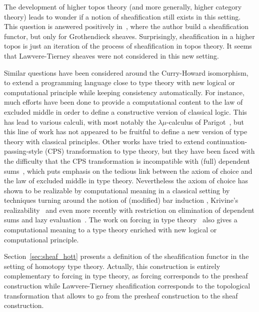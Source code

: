 The development of higher topos theory (and more generally, higher
category theory) leads to wonder if a notion of sheafification still
exists in this setting. This question is answered positively
in~\cite{lurie}, where the author build a sheafification functor, but
only for Grothendieck sheaves. Surprisingly, sheafification in a higher
topos is just an iteration of the process of sheafification in topos
theory. It seems that Lawvere-Tierney sheaves were not considered in
this new setting.

Similar questions have been considered around the Curry-Howard
isomorphism, to extend a programming language close to type theory
with new logical or computational principle while keeping consistency
automatically.
%
For instance, much efforts have been done to provide a computational
content to the law of excluded middle in order to define a
constructive version of classical logic. This has lead to various
calculi, with most notably the $\lambda \mu$-calculus of
Parigot~\cite{parigot1993classical}, but this line of work has not
appeared to be fruitful to define a new version of type theory with
classical principles.
%
Other works have tried to extend continuation-passing-style (CPS)
transformation to type theory, but they have been faced with the
difficulty that the CPS transformation is incompatible with (full) dependent
sums~\cite{barthe2002cps}, which puts emphasis on the tedious link
between the axiom of choice and the law of excluded middle in type theory.
%
Nevertheless the axiom of choice has shown to be realizable by
computational meaning in a classical setting by techniques turning
around the notion of (modified) bar induction
\cite{berardi1998computational}, Krivine's
realizability~\cite{krivine2003dependent} and even more recently with
restriction on elimination of dependent sums and lazy
evaluation~\cite{herbelin2012constructive}.
The work on forcing in type theory~\cite{jaber2012extending,forcing2016} also
gives a computational meaning to a type theory enriched with new
logical or computational principle.

Section~\ref{sec:sheaf_hott} presents a definition of the
sheafification functor in the setting of homotopy type
theory. Actually, this construction is entirely complementary to
forcing in type theory, as forcing corresponds to the presheaf
construction while Lawvere-Tierney sheafification corresponds to the
topological transformation that allows to go from the presheaf
construction to the sheaf construction.



